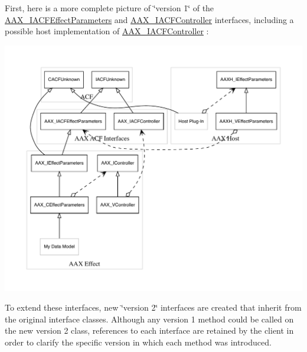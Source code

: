 First, here is a more complete picture of \char`\"{}version 1\char`\"{} of the \mbox{\hyperlink{a01669}{A\+A\+X\+\_\+\+I\+A\+C\+F\+Effect\+Parameters}} and \mbox{\hyperlink{a01637}{A\+A\+X\+\_\+\+I\+A\+C\+F\+Controller}} interfaces, including a possible host implementation of \mbox{\hyperlink{a01637}{A\+A\+X\+\_\+\+I\+A\+C\+F\+Controller}} \+:


\begin{DoxyImage}
\includegraphics[width=\textwidth,height=\textheight/2,keepaspectratio=true]{dot_aax_acf_versioning_full}
\end{DoxyImage}
 To extend these interfaces, new \char`\"{}version 2\char`\"{} interfaces are created that inherit from the original interface classes. Although any version 1 method could be called on the new version 2 class, references to each interface are retained by the client in order to clarify the specific version in which each method was introduced.


